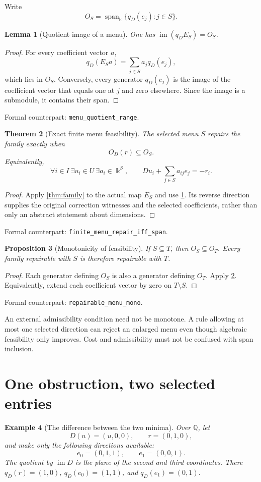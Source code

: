 \documentclass[11pt,letterpaper,oneside,openany]{book}
\theoremstyle{quiet}
\newtheorem{theorem}{Theorem}[chapter]
\newtheorem{proposition}[theorem]{Proposition}
\newtheorem{lemma}[theorem]{Lemma}
\newtheorem{example}[theorem]{Example}
\newcommand{\kk}{\Bbbk}
\newcommand{\Q}{\mathbb{Q}}
\DeclareMathOperator{\im}{im}
\DeclareMathOperator{\Span}{span}
\newcommand{\formal}[1]{\par\nobreak\begingroup\footnotesize\color{Slate}\sffamily Formal counterpart: \normalfont\nolinkurl{#1}.\par\endgroup}
\begin{document}
Write
\[
O_S=\Span_{\kk}\{q_D(e_j):j\in S\}.
\]

\begin{lemma}[Quotient image of a menu]\label{lem:menu-range}
One has $\im(q_DE_S)=O_S$.
\end{lemma}
\begin{proof}
For every coefficient vector $a$,
\[
q_D(E_Sa)=\sum_{j\in S}a_jq_D(e_j),
\]
which lies in $O_S$. Conversely, every generator $q_D(e_j)$ is the image of the coefficient vector that equals one at $j$ and zero elsewhere. Since the image is a submodule, it contains their span.
\end{proof}
\formal{menu_quotient_range}

\begin{theorem}[Exact finite menu feasibility]\label{thm:menu}
The selected menu $S$ repairs the family exactly when
\begin{equation}\label{eq:menu-criterion}
O_D(r)\subseteq O_S.
\end{equation}
Equivalently,
\[
\forall i\in I\ \exists u_i\in U\ \exists a_i\in\kk^S,
\qquad Du_i+\sum_{j\in S}a_{ij}e_j=-r_i.
\]
\end{theorem}
\begin{proof}
Apply \cref{thm:family} to the actual map $E_S$ and use \cref{lem:menu-range}. Its reverse direction supplies the original correction witnesses and the selected coefficients, rather than only an abstract statement about dimensions.
\end{proof}
\formal{finite_menu_repair_iff_span}

\begin{proposition}[Monotonicity of feasibility]\label{prop:menu-mono}
If $S\subseteq T$, then $O_S\subseteq O_T$. Every family repairable with $S$ is therefore repairable with $T$.
\end{proposition}
\begin{proof}
Each generator defining $O_S$ is also a generator defining $O_T$. Apply \cref{thm:menu}. Equivalently, extend each coefficient vector by zero on $T\setminus S$.
\end{proof}
\formal{repairable_menu_mono}

An external admissibility condition need not be monotone. A rule allowing at most one selected direction can reject an enlarged menu even though algebraic feasibility only improves. Cost and admissibility must not be confused with span inclusion.

\section{One obstruction, two selected entries}
\begin{example}[The difference between the two minima]\label{ex:menu}
Over $\Q$, let
\[
D(u)=(u,0,0),\qquad r=(0,1,0),
\]
and make only the following directions available:
\[
e_0=(0,1,1),\qquad e_1=(0,0,1).
\]
The quotient by $\im D$ is the plane of the second and third coordinates. There $q_D(r)=(1,0)$, $q_D(e_0)=(1,1)$, and $q_D(e_1)=(0,1)$.
\end{example}
\end{document}
